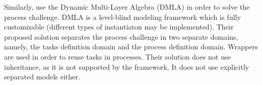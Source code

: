 Similarly, \cite{dmla2019} use the Dynamic Multi-Layer Algebra (DMLA) \citep{dmla2017} in order to solve the process challenge. DMLA is a level-blind modeling framework which is fully customizable (\eg different types of instantiaton may be implemented). Their proposed solution separates the process challenge in two separate domains, namely, the tasks definition domain and the process definition domain. Wrappers are used in order to reuse tasks in processes. Their solution does not use inheritance, as it is not supported by the framework. It does not use explicitly separated models either.


